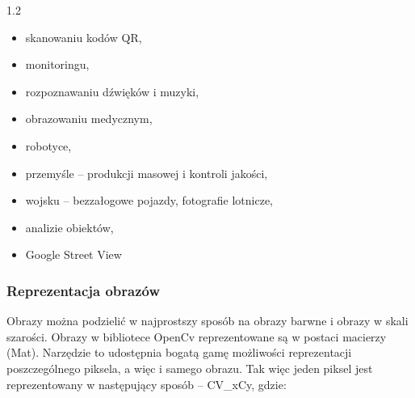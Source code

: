 \documentclass[a4paper,12pt]{article}
\newcommand\spacingInSolemnItemize{1.2}
\newcommand\spacingIndent{2.2em}
\begin{document}
			    \begin{spacing}{\spacingInSolemnItemize}
			        \begin{itemize}
        				\item skanowaniu kodów QR,
        				\item monitoringu,
        				\item rozpoznawaniu dźwięków i muzyki,
        				\item obrazowaniu medycznym,
        				\item robotyce,	
        				\item przemyśle -- produkcji masowej i kontroli jakości,
        				\item wojsku -- bezzałogowe pojazdy, fotografie lotnicze,
				        \item analizie obiektów,
				        \item Google Street View
		            \end{itemize}
                \end{spacing}
    
    	\subsubsection{Reprezentacja obrazów}
			\hspace{\spacingIndent} Obrazy można podzielić w najprostszy sposób na obrazy barwne i obrazy w skali szarości. Obrazy w bibliotece OpenCv 
				reprezentowane są w postaci macierzy (Mat). Narzędzie to udostępnia bogatą gamę możliwości reprezentacji poszczególnego piksela, 
				a więc i samego obrazu. Tak więc jeden piksel jest reprezentowany w następujący sposób -- CV\_xCy, gdzie:
			
\end{document}
